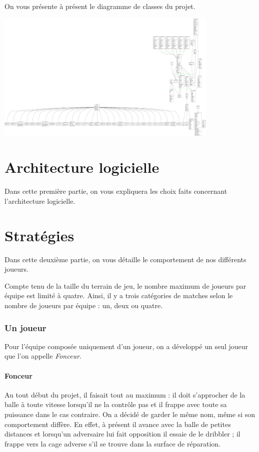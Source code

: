 \documentclass[12pt,a4paper]{article}
\begin{document}
On vous pr\'esente \`a pr\'esent le diagramme de classes du projet.

\begin{center}
  \includegraphics[width=0.8\textwidth]{classes_IA.png}\par%
\end{center}


\newpage

\part{Architecture logicielle} %
Dans cette premi\`ere partie, on vous expliquera les choix faits 
concernant l'architecture logicielle.

\newpage

\part{Strat\'egies}
Dans cette deuxi\`eme partie, on vous d\'etaille le comportement de nos 
diff\'erents joueurs.

Compte tenu de la taille du terrain de jeu, le nombre maximum de joueurs par 
\'equipe est limit\'e \`a quatre. Ainsi, il y a trois cat\'egories de matches 
selon le nombre de joueurs par \'equipe : un, deux ou quatre.

\section{Un joueur}
Pour l'\'equipe compos\'ee uniquement d'un joueur, on a d\'evelopp\'e un seul 
joueur que l'on appelle {\itshape Fonceur}. 

\subsection*{Fonceur}
Au tout d\'ebut du projet, il faisait tout au maximum : il doit 
s'approcher de la balle \`a toute vitesse lorsqu'il ne la contr\^ole pas et il 
frappe avec toute sa puissance dans le cas contraire. On a d\'ecid\'e de garder le 
m\^eme nom, m\^eme si son comportement diff\`ere. En effet, \`a pr\'esent il 
avance avec la balle de petites distances et lorsqu'un adversaire lui fait 
opposition il essaie de le dribbler ; il frappe vers la cage adverse s'il se 
trouve dans la surface de r\'eparation. 
\end{document}
